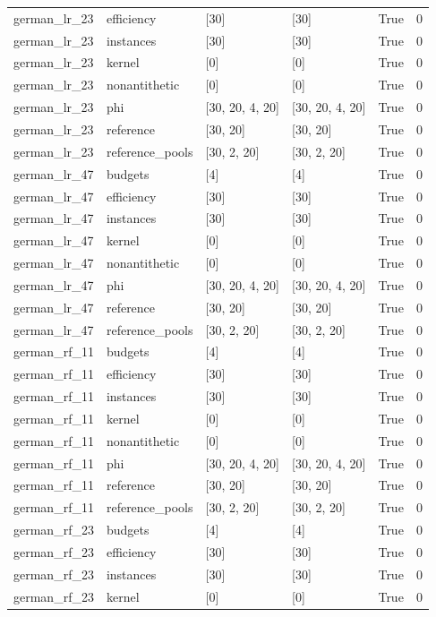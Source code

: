 \begin{tabular}{llllll}
german\_lr\_23 & efficiency & [30] & [30] & True & 0 \\
german\_lr\_23 & instances & [30] & [30] & True & 0 \\
german\_lr\_23 & kernel & [0] & [0] & True & 0 \\
german\_lr\_23 & nonantithetic & [0] & [0] & True & 0 \\
german\_lr\_23 & phi & [30, 20, 4, 20] & [30, 20, 4, 20] & True & 0 \\
german\_lr\_23 & reference & [30, 20] & [30, 20] & True & 0 \\
german\_lr\_23 & reference\_pools & [30, 2, 20] & [30, 2, 20] & True & 0 \\
german\_lr\_47 & budgets & [4] & [4] & True & 0 \\
german\_lr\_47 & efficiency & [30] & [30] & True & 0 \\
german\_lr\_47 & instances & [30] & [30] & True & 0 \\
german\_lr\_47 & kernel & [0] & [0] & True & 0 \\
german\_lr\_47 & nonantithetic & [0] & [0] & True & 0 \\
german\_lr\_47 & phi & [30, 20, 4, 20] & [30, 20, 4, 20] & True & 0 \\
german\_lr\_47 & reference & [30, 20] & [30, 20] & True & 0 \\
german\_lr\_47 & reference\_pools & [30, 2, 20] & [30, 2, 20] & True & 0 \\
german\_rf\_11 & budgets & [4] & [4] & True & 0 \\
german\_rf\_11 & efficiency & [30] & [30] & True & 0 \\
german\_rf\_11 & instances & [30] & [30] & True & 0 \\
german\_rf\_11 & kernel & [0] & [0] & True & 0 \\
german\_rf\_11 & nonantithetic & [0] & [0] & True & 0 \\
german\_rf\_11 & phi & [30, 20, 4, 20] & [30, 20, 4, 20] & True & 0 \\
german\_rf\_11 & reference & [30, 20] & [30, 20] & True & 0 \\
german\_rf\_11 & reference\_pools & [30, 2, 20] & [30, 2, 20] & True & 0 \\
german\_rf\_23 & budgets & [4] & [4] & True & 0 \\
german\_rf\_23 & efficiency & [30] & [30] & True & 0 \\
german\_rf\_23 & instances & [30] & [30] & True & 0 \\
german\_rf\_23 & kernel & [0] & [0] & True & 0 \\

\end{tabular}
